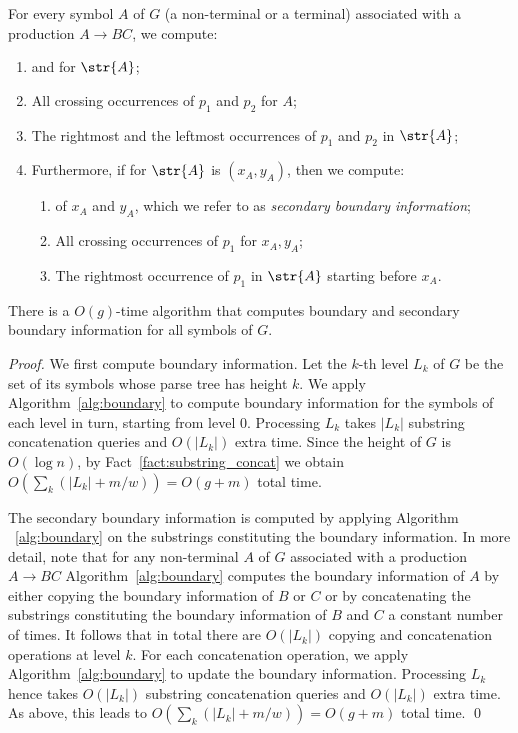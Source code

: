 For every symbol $A$ of $G$ (a non-terminal or a terminal) associated with a production $A\rightarrow BC$, we compute:
\begin{enumerate}
    \item {} and  for $\str{A}$;
    \item All crossing occurrences of $p_1$ and $p_2$ for $A$;
    \item The rightmost and the leftmost occurrences of $p_1$ and $p_2$ in $\str{A}$;
    \item Furthermore, if  for $\str{A}$ is $(x_A,y_A)$, then we compute:
    \begin{enumerate}
    	\item {} of $x_A$ and $y_A$, which we refer to as \emph{secondary boundary information};
    	\item All crossing occurrences of $p_1$ for $x_A, y_A$;
    	\item The rightmost occurrence of $p_1$ in $\str{A}$ starting before $x_A$.
   	\end{enumerate}
\end{enumerate}

\begin{proposition}
There is a $O(g)$-time algorithm that computes boundary and secondary boundary information for all symbols of $G$.
\end{proposition}
\begin{proof}
We first compute boundary information. Let the $k$-th level $L_k$ of $G$ be the set of its symbols whose parse tree has height $k$. We apply Algorithm~\ref{alg:boundary} to compute boundary information for the symbols of each level in turn, starting from level $0$. Processing $L_k$ takes $|L_k|$ substring concatenation queries and $O(|L_k|)$ extra time. Since the height of $G$ is $O(\log n)$, by Fact~\ref{fact:substring_concat} we obtain $O(\sum_{k} (|L_k| + m/w)) = O(g+m)$ total time. 

The secondary boundary information is computed by applying Algorithm ~\ref{alg:boundary} on the substrings constituting the boundary information. In more detail, note that for any non-terminal $A$ of $G$ associated with a production $A \rightarrow BC$ Algorithm~\ref{alg:boundary} computes the boundary information of $A$ by either copying the boundary information of $B$ or $C$ or by concatenating the substrings constituting the boundary information of $B$ and $C$ a constant number of times. It follows that in total there are $O(|L_k|)$ copying and concatenation operations at level $k$. For each concatenation operation, we apply Algorithm~\ref{alg:boundary} to update the boundary information. 
Processing $L_k$ hence takes $O(|L_k|)$ substring concatenation queries and $O(|L_k|)$ extra time. As above, this leads to  $O(\sum_{k} (|L_k| + m/w)) = O(g+m)$ total time. 
\qed
\end{proof}

